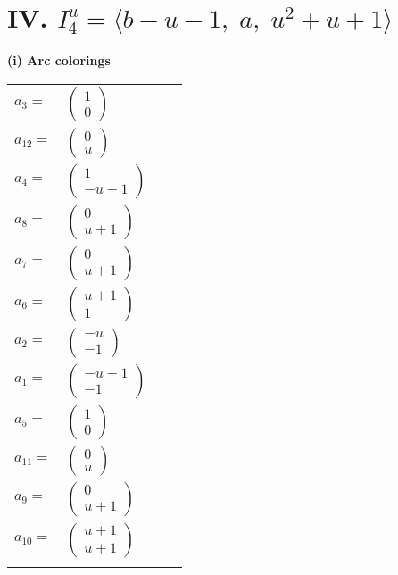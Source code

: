\documentclass[1p]{elsarticle_modified}
\theoremstyle{definition}
\begin{document}
\centering \section*{IV. $I^u_{4}= \langle b- u-1,\;a,\;u^2+u+1 \rangle$}
\flushleft \textbf{(i) Arc colorings}\\
\begin{tabular}{m{7pt} m{180pt} m{7pt} m{180pt} }
\flushright $a_{3}=$&$\begin{pmatrix}1\\0\end{pmatrix}$ \\
\flushright $a_{12}=$&$\begin{pmatrix}0\\u\end{pmatrix}$ \\
\flushright $a_{4}=$&$\begin{pmatrix}1\\- u-1\end{pmatrix}$ \\
\flushright $a_{8}=$&$\begin{pmatrix}0\\u+1\end{pmatrix}$ \\
\flushright $a_{7}=$&$\begin{pmatrix}0\\u+1\end{pmatrix}$ \\
\flushright $a_{6}=$&$\begin{pmatrix}u+1\\1\end{pmatrix}$ \\
\flushright $a_{2}=$&$\begin{pmatrix}- u\\-1\end{pmatrix}$ \\
\flushright $a_{1}=$&$\begin{pmatrix}- u-1\\-1\end{pmatrix}$ \\
\flushright $a_{5}=$&$\begin{pmatrix}1\\0\end{pmatrix}$ \\
\flushright $a_{11}=$&$\begin{pmatrix}0\\u\end{pmatrix}$ \\
\flushright $a_{9}=$&$\begin{pmatrix}0\\u+1\end{pmatrix}$ \\
\flushright $a_{10}=$&$\begin{pmatrix}u+1\\u+1\end{pmatrix}$\\&\end{tabular}
\end{document}
